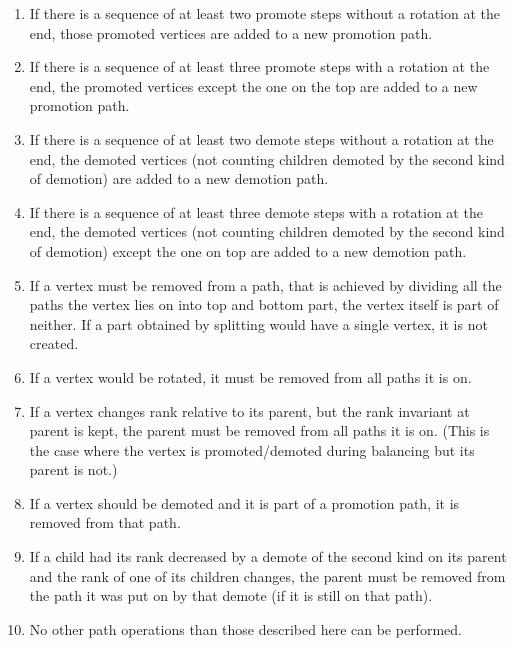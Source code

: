 \begin{enumerate}

\item If there is a sequence of at least two promote steps without a rotation at the end, those promoted vertices are added to a new promotion path. 

\item If there is a sequence of at least three promote steps with a rotation at the end, the promoted vertices except the one on the top are added to a new promotion path.

\item If there is a sequence of at least two demote steps without a rotation at the end, the demoted vertices (not counting children demoted by the second kind of demotion) are added to a new demotion path.

\item If there is a sequence of at least three demote steps with a rotation at the end, the demoted vertices (not counting children demoted by the second kind of demotion) except the one on top are added to a new demotion path.

\item If a vertex must be removed from a path, that is achieved by dividing all the paths the vertex lies on into top and bottom part, the vertex itself is part of neither. If a part obtained by splitting would have a single vertex, it is not created.

\item If a vertex would be rotated, it must be removed from all paths it is on.

\item If a vertex changes rank relative to its parent, but the rank invariant at parent is kept, the parent must be removed from all paths it is on. (This is the case where the vertex is promoted/demoted during balancing but its parent is not.)

\item If a vertex should be demoted and it is part of a promotion path, it is removed from that path.

\item If a child had its rank decreased by a demote of the second kind on its parent and the rank of one of its children changes, the parent must be removed from the path it was put on by that demote (if it is still on that path).

\item No other path operations than those described here can be performed.

\end{enumerate}

